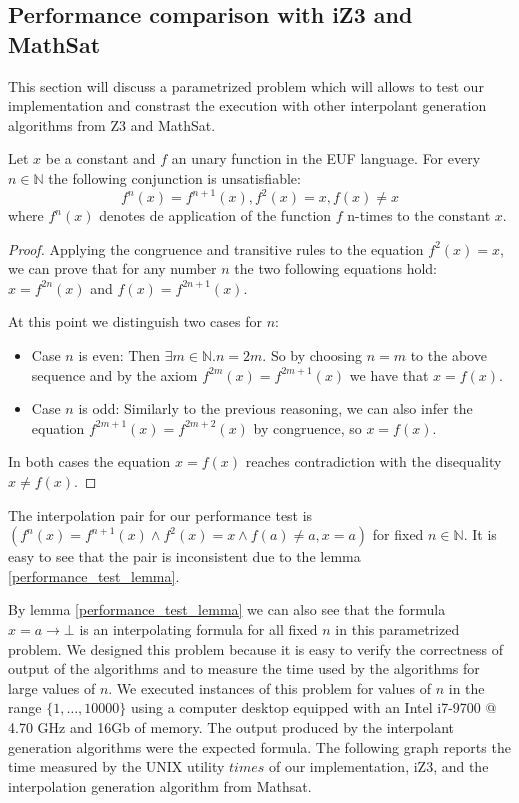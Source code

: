 \subsection{Performance comparison with iZ3 and MathSat}\label{performance_euf}

This section will discuss a parametrized problem 
which will allows to test 
our implementation and constrast the execution with 
other interpolant generation
algorithms from Z3 and MathSat.

\begin{lemma} \label{performance_test_lemma}
  Let $x$ be a constant and $f$ an unary function in the EUF language. 
  For every $n \in \mathbb{N}$ the following conjunction is unsatisfiable:
  \begin{equation*}
    f^n(x) = f^{n+1}(x), f^2(x) = x, f(x) \neq x
  \end{equation*}
  where $f^n(x)$ denotes de application of the function $f$ n-times
  to the constant $x$.
\end{lemma}

\begin{proof}
  Applying the congruence and transitive rules to the equation $f^2(x) = x$, 
  we can prove that for any number $n$ the two following equations hold:
  $x = f^{2n}(x)$ and $f(x) = f^{2n+1}(x)$.

  At this point we distinguish two cases for $n$:

  \begin{itemize}
    \item Case $n$ is even: Then $\exists m \in \mathbb{N} . n = 2m$.
      So by choosing $n = m$ to the above sequence
      and by the axiom $f^{2m}(x) = f^{2m+1}(x)$ we have that
      $x = f(x)$.
    \item Case $n$ is odd: Similarly to the previous reasoning, 
      we can also infer the equation $f^{2m+1}(x) = f^{2m+2}(x)$
      by congruence, so $x = f(x)$.
    \end{itemize}

    In both cases the equation $x = f(x)$ reaches contradiction with the
    disequality $x \neq f(x)$.
\end{proof}

The interpolation pair for our performance test 
is $(f^n(x) = f^{n+1}(x) \land f^2(x) = x \land f(a) \neq a, x = a)$
for fixed $n \in \mathbb{N}$.
It is easy to see that the pair is inconsistent due to the lemma 
\ref{performance_test_lemma}. 

By lemma \ref{performance_test_lemma}
we can also see that the formula $x = a \rightarrow \bot$ is an 
interpolating formula for all fixed $n$ in this parametrized problem.
We designed this problem because it is easy to verify the 
correctness of output of the algorithms and to measure 
the time used by the algorithms for large values of $n$. 
We executed instances of this problem for values of $n$
in the range $\{1, \dots, 10000\}$ using a computer desktop
equipped with an Intel i7-9700 @ 4.70 GHz and 16Gb of memory. 
The output produced by the interpolant generation algorithms
were the expected formula.
The following graph reports the time measured by the UNIX
utility $times$ of our implementation, iZ3, and the interpolation 
generation algorithm from Mathsat.

